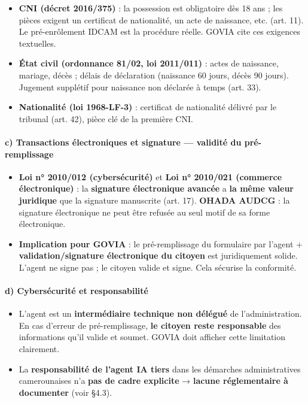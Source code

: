 \documentclass[
]{article}
\providecommand{\tightlist}{%
  \setlength{\itemsep}{0pt}\setlength{\parskip}{0pt}}
\begin{document}
\begin{itemize}
\tightlist
\item
  \textbf{CNI (décret 2016/375)} : la possession est obligatoire dès 18
  ans ; les pièces exigent un certificat de nationalité, un acte de
  naissance, etc. (art. 11). Le pré-enrôlement IDCAM est la procédure
  réelle. GOVIA cite ces exigences textuelles.
\item
  \textbf{État civil (ordonnance 81/02, loi 2011/011)} : actes de
  naissance, mariage, décès ; délais de déclaration (naissance 60 jours,
  décès 90 jours). Jugement supplétif pour naissance non déclarée à
  temps (art. 33).
\item
  \textbf{Nationalité (loi 1968-LF-3)} : certificat de nationalité
  délivré par le tribunal (art. 42), pièce clé de la première CNI.
\end{itemize}

\paragraph{c) Transactions électroniques et signature --- validité du
pré-remplissage}\label{c-transactions-uxe9lectroniques-et-signature-validituxe9-du-pruxe9-remplissage}

\begin{itemize}
\tightlist
\item
  \textbf{Loi n° 2010/012 (cybersécurité)} et \textbf{Loi n° 2010/021
  (commerce électronique)} : la \textbf{signature électronique avancée}
  a \textbf{la même valeur juridique} que la signature manuscrite (art.
  17). \textbf{OHADA AUDCG} : la signature électronique ne peut être
  refusée au seul motif de sa forme électronique.
\item
  \textbf{Implication pour GOVIA} : le pré-remplissage du formulaire par
  l'agent + \textbf{validation/signature électronique du citoyen} est
  juridiquement solide. L'agent ne signe pas ; le citoyen valide et
  signe. Cela sécurise la conformité.
\end{itemize}

\paragraph{d) Cybersécurité et
responsabilité}\label{d-cybersuxe9curituxe9-et-responsabilituxe9}

\begin{itemize}
\tightlist
\item
  L'agent est un \textbf{intermédiaire technique non délégué} de
  l'administration. En cas d'erreur de pré-remplissage, \textbf{le
  citoyen reste responsable} des informations qu'il valide et soumet.
  GOVIA doit afficher cette limitation clairement.
\item
  La \textbf{responsabilité de l'agent IA tiers} dans les démarches
  administratives camerounaises n'a \textbf{pas de cadre explicite} →
  \textbf{lacune réglementaire à documenter} (voir §4.3).
\end{itemize}
\end{document}
